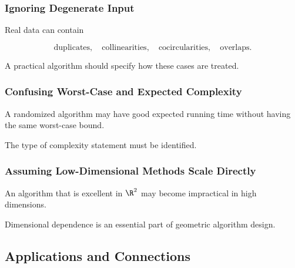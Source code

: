 \subsubsection{Ignoring Degenerate Input}

Real data can contain

\[
\boxed{
\text{duplicates},
\quad
\text{collinearities},
\quad
\text{cocircularities},
\quad
\text{overlaps}.
}
\]

A practical algorithm should specify how these cases are treated.

\subsubsection{Confusing Worst-Case and Expected Complexity}

A randomized algorithm may have good expected running time without having
the same worst-case bound.

The type of complexity statement must be identified.

\subsubsection{Assuming Low-Dimensional Methods Scale Directly}

An algorithm that is excellent in \(\R^2\) may become impractical in high
dimensions.

Dimensional dependence is an essential part of geometric algorithm design.

\subsection{Applications and Connections}
\label{subsec:computational-geometry-applications}

